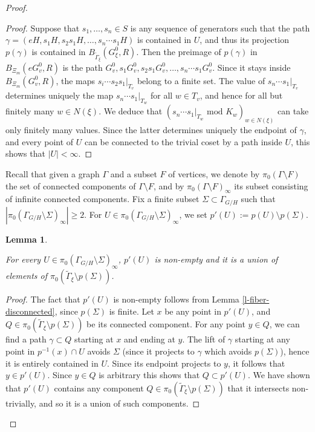 \documentclass[11pt]{amsart}
\newcommand{\Gammatilde}{\ensuremath{\widetilde{\Gamma}}}%
\theoremstyle{definition}
\theoremstyle{plain}
\newtheorem{main thm}{Theorem}
\newtheorem{lemma}[defin]{Lemma}
\theoremstyle{remark}
\theoremstyle{plain}
\begin{document}
\begin{proof}
\begin{proof}
Suppose that $s_1, \ldots, s_n\in S$ is any sequence of generators such that the path $\gamma=(eH, s_1H, s_2s_1H, \ldots, s_n\cdots s_1H)$ is contained in $U$, and thus its projection $p(\gamma)$ is contained in $B_{\Gammatilde_\xi}(G^0_\xi, R)$. 
Then the preimage of $p(\gamma)$ in $B_{\Xi_m}(eG^0_v, R)$ is the path 
$G^0_v, s_1G^0_v, s_2s_1G^0_v , \ldots, s_n\cdots s_1G^0_v$. Since it stays inside $B_{\Xi_m}(G^0_v, R)$, the maps $s_i\cdots s_2s_1|_{T_v}$ belong to a finite set.  The value of $s_n\cdots s_1\vert_{T_v}$ determines uniquely the map $s_n\cdots s_1|_{T_w}$ for all $w\in T_v$, and hence for all but finitely many $w\in N(\xi)$. We deduce that  $(s_n\cdots s_1|_{T_w}\text{ mod }K_w)_{w\in N(\xi)}$ can take only finitely many values. Since the latter determines uniquely the endpoint of $\gamma$, and every point of $U$ can be connected to the trivial coset by a path inside $U$, this shows that $|U|<\infty$.  \qedhere
\end{proof}

Recall that given a graph $\Gamma$ and a subset $F$ of vertices, we denote by $\pi_0(\Gamma\setminus F)$ the set of connected components of $\Gamma\setminus F$, and by $\pi_0(\Gamma\setminus F)_\infty$ its subset consisting of infinite connected components. Fix a finite subset $\Sigma\subset\Gamma_{G/H}$ such that $|\pi_0(\Gamma_{G/H}\setminus\Sigma)_\infty|\ge 2$.  For $U\in \pi_0(\Gamma_{G/H}\setminus\Sigma)_\infty$, we set $p'(U):=p(U)\setminus p(\Sigma)$.

\begin{lemma}\label{l-projection-union-cc}

For every $U\in \pi_0(\Gamma_{G/H}\setminus\Sigma)_\infty$, $p'(U)$ is non-empty and it is a union of elements of $\pi_0(\Gammatilde_\xi\setminus p(\Sigma))$.
    
\end{lemma}
\begin{proof}
    The fact that $p'(U)$ is non-empty follows from Lemma \ref{l-fiber-disconnected}, since $p(\Sigma)$ is finite. Let $x$ be any point in $p'(U)$, and $Q\in \pi_0(\Gammatilde_\xi\setminus p(\Sigma))$ be its connected component. For any point $y\in Q$, we can find a path $\gamma\subset Q$ starting at $x$ and ending at $y$. The lift of $\gamma$ starting at any point in $p^{-1}(x)\cap U$ avoids $\Sigma$ (since it projects to $\gamma$ which avoids $p(\Sigma)$), hence it is entirely contained in $U$. Since its endpoint projects to $y$, it follows that $y\in p'(U)$. Since $y\in Q$ is arbitrary this shows that $Q\subset p'(U)$. We have shown that $p'(U)$ contains any component  $Q\in \pi_0(\Gammatilde_\xi\setminus p(\Sigma))$ that it intersects non-trivially, and so it is a union of such components. \qedhere



\end{proof}
\end{proof}
\end{document}
